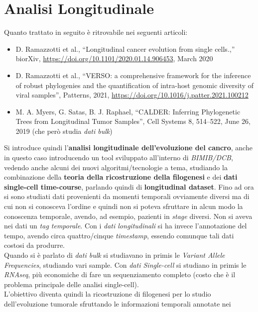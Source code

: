 \documentclass[a4paper,12pt, oneside]{book}
\begin{document}
\section{Analisi Longitudinale}
\begin{shaded}
  Quanto trattato in seguito è ritrovabile nei seguenti articoli:
  \begin{itemize}
    \item D. Ramazzotti et al., “Longitudinal cancer evolution from single
    cells.,” biorXiv, \url{https://doi.org/10.1101/2020.01.14.906453}, March
    2020 
    \item D. Ramazzotti et al., “VERSO: a comprehensive framework for the
    inference of robust phylogenies and the quantification of intra-host genomic
    diversity of viral samples”, Patterns, 2021,
    \url{https://doi.org/10.1016/j.patter.2021.100212} 
    \item M. A. Myers, G. Satas, B. J. Raphael, “CALDER: Inferring Phylogenetic
    Trees from Longitudinal Tumor Samples”, Cell Systems 8, 514–522, June 26,
    2019 (che però studia \textit{dati bulk})
  \end{itemize}
\end{shaded}
Si introduce quindi l'\textbf{analisi longitudinale dell'evoluzione del cancro},
anche in questo caso introducendo un tool sviluppato all'interno di
\textit{BIMIB/DCB}, vedendo anche alcuni dei nuovi algoritmi/tecnologie a tema,
studiando la combinazione della \textbf{teoria della ricostruzione della
  filogenesi} e dei \textbf{dati single-cell time-course}, parlando quindi di
\textbf{longitudinal dataset}. Fino ad ora si sono studiati dati provenienti da
momenti temporali ovviamente diversi ma di cui non si conosceva l'ordine e
quindi non si poteva sfruttare in alcun modo la conoscenza temporale, avendo, ad
esempio, pazienti in \textit{stage} diversi. Non si aveva nei dati un
\textit{tag temporale}.
Con i \textit{dati longitudinali} si ha invece l'annotazione del tempo, avendo
circa quattro/cinque \textit{timestamp}, essendo comunque tali dati costosi da
produrre.\\
Quando si è parlato di \textit{dati bulk} si studiavano in primis le
\textit{Variant Allele Frequencies}, studiando vari sample. Con \textit{dati
  Single-cell} si studiano in primis le \textit{RNAseq}, più economiche di fare
un sequenziamento completo (costo che è il problema principale delle analisi
single-cell).  \\
L'obiettivo diventa quindi la ricostruzione di filogenesi per lo studio
dell'evoluzione tumorale sfruttando le informazioni temporali annotate nei
\end{document}
